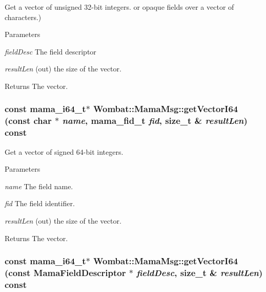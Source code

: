 Get a vector of unsigned 32-\/bit integers. or opaque fields over a vector of characters.) 
\begin{DoxyParams}{Parameters}
\item[{\em fieldDesc}]The field descriptor \item[{\em resultLen}](out) the size of the vector. \end{DoxyParams}
\begin{DoxyReturn}{Returns}
The vector. 
\end{DoxyReturn}
\hypertarget{classWombat_1_1MamaMsg_a0dd9089d544e24910d14142dbe6a6449}{
\subsubsection[{getVectorI64}]{\setlength{\rightskip}{0pt plus 5cm}const mama\_\-i64\_\-t$\ast$ Wombat::MamaMsg::getVectorI64 (const char $\ast$ {\em name}, \/  mama\_\-fid\_\-t {\em fid}, \/  size\_\-t \& {\em resultLen}) const}}
\label{classWombat_1_1MamaMsg_a0dd9089d544e24910d14142dbe6a6449}


Get a vector of signed 64-\/bit integers. 
\begin{DoxyParams}{Parameters}
\item[{\em name}]The field name. \item[{\em fid}]The field identifier. \item[{\em resultLen}](out) the size of the vector. \end{DoxyParams}
\begin{DoxyReturn}{Returns}
The vector. 
\end{DoxyReturn}
\hypertarget{classWombat_1_1MamaMsg_a608717833fd046f1f157c4e4752b8feb}{
\subsubsection[{getVectorI64}]{\setlength{\rightskip}{0pt plus 5cm}const mama\_\-i64\_\-t$\ast$ Wombat::MamaMsg::getVectorI64 (const {\bf MamaFieldDescriptor} $\ast$ {\em fieldDesc}, \/  size\_\-t \& {\em resultLen}) const}}
\label{classWombat_1_1MamaMsg_a608717833fd046f1f157c4e4752b8feb}


